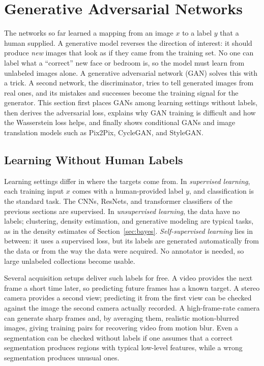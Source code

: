 \section{Generative Adversarial Networks}
\label{sec:gan}

The networks so far learned a mapping from an image $x$ to a label $y$ that a
human supplied. A generative model reverses the direction of interest: it
should produce \emph{new} images that look as if they came from the training
set. No one can label what a ``correct'' new face or bedroom is, so the model
must learn from unlabeled images alone. A generative adversarial network (GAN)
solves this with a trick. A second network, the discriminator, tries to tell
generated images from real ones, and its mistakes and successes become the
training signal for the generator. This section first places GANs among
learning settings without labels, then derives the adversarial loss, explains
why GAN training is difficult and how the Wasserstein loss helps, and finally
shows conditional GANs and image translation models such as Pix2Pix, CycleGAN,
and StyleGAN.

\subsection{Learning Without Human Labels}

Learning settings differ in where the targets come from. In \emph{supervised
learning}, each training input $x$ comes with a human-provided label $y$, and
classification is the standard task. The CNNs, ResNets, and transformer
classifiers of the previous sections are supervised. In \emph{unsupervised
learning}, the data have no labels; clustering, density estimation, and
generative modeling are typical tasks, as in the density estimates of
Section~\ref{sec:bayes}. \emph{Self-supervised learning} lies in between:
it uses a supervised loss, but its labels are generated automatically from the
data or from the way the data were acquired. No annotator is needed, so large
unlabeled collections become usable.

Several acquisition setups deliver such labels for free. A video provides the
next frame a short time later, so predicting future frames has a known target.
A stereo camera provides a second view; predicting it from the first view can
be checked against the image the second camera actually recorded. A
high-frame-rate camera can generate sharp frames and, by averaging them,
realistic motion-blurred images, giving training pairs for recovering video
from motion blur. Even a segmentation can be checked without labels if one
assumes that a correct segmentation produces regions with typical low-level
features, while a wrong segmentation produces unusual ones.

